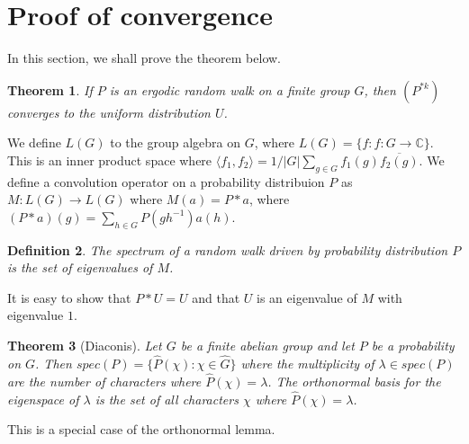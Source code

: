 \documentclass[]{article}
\newtheorem{theorem}{Theorem}
\newtheorem{definition}[theorem]{Definition}
\theoremstyle{definition}
\numberwithin{theorem}{section}
\numberwithin{equation}{section}
\begin{document}
\section{Proof of convergence}
In this section, we shall prove the theorem below.
\begin{theorem}
	If $P$ is an ergodic random walk on a finite group $G$, then $(P^{\ast k})$ converges to the uniform distribution $U$. 
\end{theorem}
We define $L(G)$ to the group algebra on $G$, where $L(G) = \lbrace f : f: G \rightarrow \mathbb{C} \rbrace$. This is an inner product space where $\langle f_1, f_2 \rangle = 1/|G| \sum_{g \in G} f_1(g) \overline{f_2(g)}$. 
We define a convolution operator on a probability distribuion $P$ as $M : L(G) \rightarrow L(G)$ where $M(a) = P \ast a$, where $(P \ast a) (g) =\sum_{h\in G} P(gh^{-1})a(h)$.
\begin{definition}
	The spectrum of a random walk driven by probability distribution $P$ is the set of eigenvalues of $M$. 
\end{definition} 
It is easy to show that $P \ast U = U$ and that $U$ is an eigenvalue of $M$ with eigenvalue $1$. 


\begin{theorem}[Diaconis]
	Let $G$ be a finite abelian group and let $P$ be a probability on $G$. Then $spec(P) = \lbrace \hat{P}(\chi) : \chi \in \hat{G} \rbrace$ where the multiplicity of $\lambda \in spec(P)$ are the number of characters where $\hat{P}(\chi) = \lambda$. The orthonormal basis for the eigenspace of $\lambda$ is the set of all characters $\chi$ where $\hat{P}(\chi) = \lambda$. 
\end{theorem}

This is a special case of the orthonormal lemma.
\end{document}
